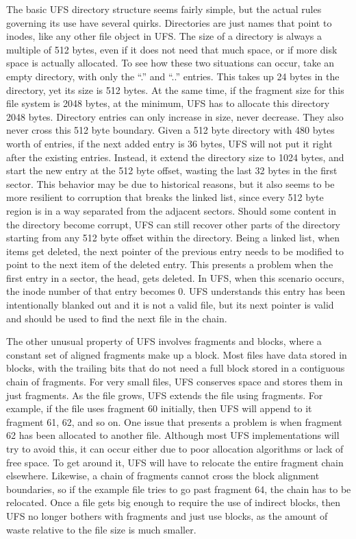 The basic UFS directory structure seems fairly simple, but the actual rules
governing its use have several quirks. Directories are just names that point
to inodes, like any other file object in UFS. The size of a directory is
always a multiple of 512 bytes, even if it does not need that much space, or
if more disk space is actually allocated. To see how these two situations can
occur, take an empty directory, with only the ``.'' and ``..'' entries.
This takes up 24 bytes in the directory, yet its size is 512 bytes.
At the same time, if the fragment size for this file system is 2048 bytes, at
the minimum, UFS has to allocate this directory 2048 bytes. Directory entries
can only increase in size, never decrease. They also never cross this 512 byte
boundary. Given a 512 byte directory with 480 bytes worth of entries, if the
next added entry is 36 bytes, UFS will not put it right after the existing
entries. Instead, it extend the directory size to 1024 bytes, and start the new
entry at the 512 byte offset, wasting the last 32 bytes in the first sector.
This behavior may be due to historical reasons, but it also seems to be more
resilient to corruption that breaks the linked list, since every 512 byte
region is in a way separated from the adjacent sectors. Should some content in
the directory become corrupt, UFS can still recover other parts of the
directory starting from any 512 byte offset within the directory. Being a
linked list, when items get deleted, the next pointer of the previous entry
needs to be modified to point to the next item of the deleted entry. This
presents a problem when the first entry in a sector, the head, gets deleted.
In UFS, when this scenario occurs, the inode number of that entry becomes 0.
UFS understands this entry has been intentionally blanked out and it is not a
valid file, but its next pointer is valid and should be used to find the next
file in the chain.

The other unusual property of UFS involves fragments and blocks, where a
constant set of aligned fragments make up a block. Most files have data stored
in blocks, with the trailing bits that do not need a full block stored in a
contiguous chain of fragments. For very small files, UFS conserves space and
stores them in just fragments. As the file grows, UFS extends the file using
fragments. For example, if the file uses fragment 60 initially, then UFS will
append to it fragment 61, 62, and so on. One issue that presents a problem is
when fragment 62 has been allocated to another file. Although most UFS
implementations will try to avoid this, it can occur either due to poor
allocation algorithms or lack of free space. To get around it, UFS will have
to relocate the entire fragment chain elsewhere. Likewise, a chain of fragments
cannot cross the block alignment boundaries, so if the example file tries to
go past fragment 64, the chain has to be relocated. Once a file gets big enough
to require the use of indirect blocks, then UFS no longer bothers with
fragments and just use blocks, as the amount of waste relative to the file size
is much smaller.

